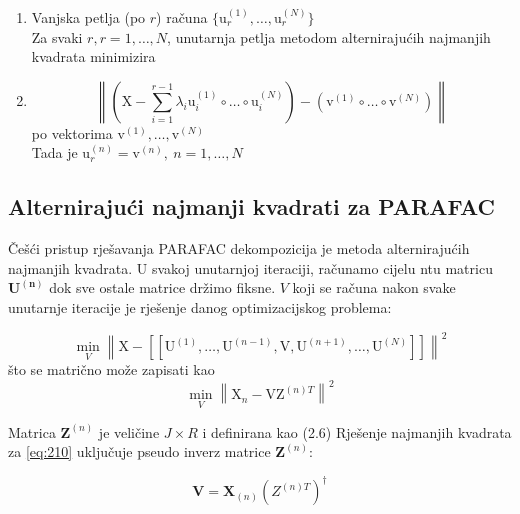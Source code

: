 \documentclass[11pt]{article}
\begin{document}
\begin{enumerate}
    \item Vanjska petlja (po $r$) računa $\lbrace \mathrm{u}_{r}^{(1)}, \dots , \mathrm{u}_{r}^{(N)} \rbrace$\\
            Za svaki $r, r = 1, \dots ,N$, unutarnja petlja metodom alternirajućih najmanjih kvadrata minimizira 
     \item
        \begin{equation}
            \left\| \left(\bm{\mathrm X} - \displaystyle\sum_{i=1}^{r-1}\lambda_{i} \mathrm{u}_{i}^{(1)} \circ \dots \circ \mathrm{u}_{i}^{(N)}\right) - \left(\mathrm{v}^{(1)} \circ \dots \circ \mathrm{v}^{(N)}\right) \right\|
        \end{equation}
        po vektorima $\mathrm{v}^{(1)}, \dots , \mathrm{v}^{(N)}$\\
        Tada je 
            $\mathrm{u}_{r}^{(n)} = \mathrm{v}^{(n)},~ n = 1, \dots , N$

\end{enumerate}

\subsection{Alternirajući najmanji kvadrati za PARAFAC}

Češći pristup rješavanja PARAFAC dekompozicija je metoda alternirajućih najmanjih kvadrata.
U svakoj unutarnjoj iteraciji, računamo cijelu ntu matricu $\boldsymbol{U^{(n)}}$ dok sve ostale matrice držimo fiksne.
$V$ koji se računa nakon svake unutarnje iteracije je rješenje danog optimizacijskog problema:

\begin{equation}
    \min_{V} \left\| \bm{\mathrm X} - [[ \mathrm{U}^{(1)},\dots , \mathrm{U}^{(n-1)}, \mathrm{V},\mathrm{U}^{(n+1)},\dots ,\mathrm{U}^{(N)} ]] \right\|^{2}
\end{equation}
što se matrično može zapisati kao
\begin{equation}\label{eq:210}
    \min_{V} \left\|\mathrm{X}_{n} - \mathrm{V}\mathrm{Z}^{(n)T} \right\|^{2}
\end{equation}

Matrica $\boldsymbol{Z}^{(n)}$ je veličine $J \times R$ i definirana kao (2.6)
Rješenje najmanjih kvadrata za \ref{eq:210} uključuje pseudo inverz matrice $\boldsymbol{Z} ^{(n)}$:

\begin{equation}
    \boldsymbol{V} = \boldsymbol{X}_{(n)} (Z^{(n)T})^{\dagger}
\end{equation}
\end{document}
